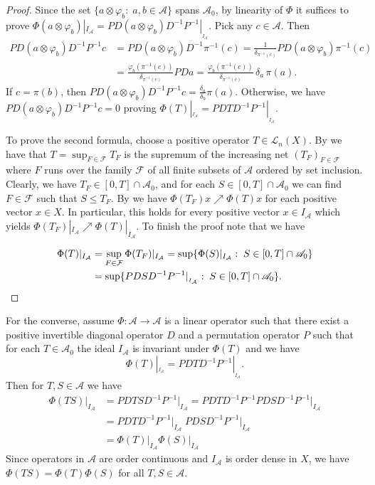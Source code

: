 \documentclass[12pt,reqno]{amsart}
\theoremstyle{plain}
\theoremstyle{definition}
\begin{document}
\begin{proof}
Since the set $\{a\otimes \varphi_b:\; a,b\in \mathcal A\}$ spans $\mathscr A_0$, by linearity of $\Phi$ it suffices to prove $\Phi(a\otimes \varphi_b)|_{I_{\mathcal A}}=PD(a\otimes \varphi_b)D^{-1}P^{-1}|_{_{I_{\mathcal A}}}$.
Pick any $c\in \mathcal A$. Then
\begin{align*}
PD(a\otimes \varphi_b)D^{-1}P^{-1}c& = PD(a\otimes \varphi_b)D^{-1}\pi^{-1}(c)=\frac{1}{\delta_{\pi^{-1}(c)}}PD(a\otimes \varphi_b)\pi^{-1}(c)\\
&=\frac{\varphi_b(\pi^{-1}(c))}{\delta_{\pi^{-1}(c)}}PDa=\frac{\varphi_b(\pi^{-1}(c))}{\delta_{\pi^{-1}(c)}}\,\delta_a\,\pi(a).
\end{align*}
If $c=\pi(b)$, then $PD(a\otimes \varphi_b)D^{-1}P^{-1}c=\frac{\delta_a}{\delta_b}\pi(a)$. Otherwise, we have $PD(a\otimes \varphi_b)D^{-1}P^{-1}c=0$ proving $\Phi(T)|_{_{I_{\mathcal A}}}=PDTD^{-1}P^{-1}|_{_{I_{\mathcal A}}}$.

To prove the second formula, choose a positive operator $T\in \mathscr L_n(X)$. By   we have that $T=\sup_{F\in \mathcal F}T_F$ is the supremum of the increasing net $(T_F)_{F\in \mathcal F}$ where $F$ runs over the family $\mathcal F$ of all finite subsets of $\mathcal A$ ordered by set inclusion. Clearly, we have $T_F\in [0,T]\cap \mathscr A_0$, and for each 
$S\in [0,T]\cap \mathscr A_0$ we can find $F\in \mathcal F$ such that $S\leq T_F$. By  we have $\Phi(T_F)x\nearrow \Phi(T)x$ for each positive vector $x\in X$. In particular, this holds for every positive vector $x\in I_{\mathcal A}$ which yields $\Phi(T_F)|_{I_{\mathcal A}}\nearrow \Phi(T)|_{I_{\mathcal A}}$. To finish the proof note that we have


\begin{align*}
\Phi(T)|_{I_{\mathcal A}}&=\sup_{F\in \mathcal F}\Phi(T_F)|_{I_{\mathcal A}}=\sup \{\Phi(S)|_{I_{\mathcal A}}:\; S\in [0,T]\cap \mathscr A_0\}\\
&=\sup \{PDSD^{-1}P^{-1}|_{_{I_{\mathcal A}}}:\; S\in [0,T]\cap \mathscr A_0\}.\qedhere
\end{align*}
\end{proof}

For the converse, assume $\Phi\colon \mathscr A\to \mathscr A$ is a linear operator such that there exist a positive invertible diagonal operator $D$ and a permutation operator $P$ such that for each $T\in \mathscr A_0$ the ideal $I_{\mathcal A}$ is invariant under $\Phi(T)$ and we have
$$\Phi(T)|_{_{I_{\mathcal A}}}=PDTD^{-1}P^{-1}|_{_{I_{\mathcal A}}}.$$ 
Then for $T,S\in \mathscr A$ we have 
\begin{align*}
\Phi(TS)\big|_{I_{\mathcal A}}
&= PDTSD^{-1}P^{-1}\big|_{I_{\mathcal A}}
= PDTD^{-1}P^{-1} PDSD^{-1}P^{-1}\big|_{I_{\mathcal A}} \\
&= PDTD^{-1}P^{-1}\big|_{I_{\mathcal A}} \; PDSD^{-1}P^{-1}\big|_{I_{\mathcal A}}\\
&=\Phi(T)\big|_{I_{\mathcal A}}\Phi(S)\big|_{I_{\mathcal A}}
\end{align*}
Since operators in $\mathscr A$ are order continuous and $I_{\mathcal A}$ is order dense in $X$, we have $\Phi(TS)=\Phi(T)\Phi(S)$ for all $T,S\in \mathscr A$. 
\end{document}
